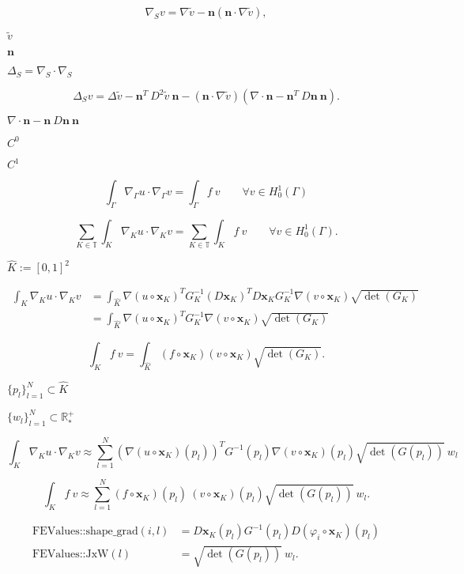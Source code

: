 \documentclass{article}
\begin{document}
\[ \nabla_S v = \nabla \tilde v - \mathbf n (\mathbf n \cdot \nabla \tilde v), \]
\pagebreak

$\tilde v$
\pagebreak

$\mathbf n$
\pagebreak

$\Delta_S = \nabla_S \cdot \nabla_S$
\pagebreak

\[ \Delta_S v = \Delta \tilde v - \mathbf n^T \ D^2 \tilde v \ \mathbf n - (\mathbf n \cdot \nabla \tilde v) (\nabla \cdot \mathbf n - \mathbf n^T \ D \mathbf n \ \mathbf n ). \]
\pagebreak

$\nabla \cdot \mathbf n - \mathbf n \ D \mathbf n \ \mathbf n$
\pagebreak

$C^0$
\pagebreak

$C^1$
\pagebreak

\[ \int_\Gamma \nabla_\Gamma u \cdot \nabla_\Gamma v = \int_\Gamma f \ v \qquad \forall v \in H^1_0(\Gamma) \]
\pagebreak

\[ \sum_{K\in {\mathbb T}}\int_K \nabla_{K} u \cdot \nabla_{K} v = \sum_{K\in {\mathbb T}} \int_K f \ v \qquad \forall v \in H^1_0(\Gamma). \]
\pagebreak

$\hat K:= [0,1]^2$
\pagebreak

\begin{align*} \int_{K} \nabla_{K} u \cdot \nabla_{K} v &= \int_{\hat K} \nabla (u \circ \mathbf x_K)^T G_K^{-1} (D \mathbf x_K)^T D \mathbf x_K G_K^{-1} \nabla (v \circ \mathbf x_K) \sqrt{\det (G_K)} \\ &= \int_{\hat K} \nabla (u \circ \mathbf x_K)^T G_K^{-1} \nabla (v \circ \mathbf x_K) \sqrt{\det (G_K)} \end{align*}
\pagebreak

\[ \int_{K} f \ v = \int_{\hat K} (f \circ \mathbf x_K) (v \circ \mathbf x_K) \sqrt{\det (G_K)}. \]
\pagebreak

$\{p_l\}_{l=1}^N\subset \hat K$
\pagebreak

$\{w_l\}_{l=1}^N \subset \mathbb R^+_*$
\pagebreak

\[\int_{K} \nabla_{K} u \cdot \nabla_{K} v \approx \sum_{l=1}^N (\nabla (u \circ \mathbf x_K)(p_l))^T G^{-1}(p_l) \nabla (v \circ \mathbf x_K) (p_l) \sqrt{\det (G(p_l))} \ w_l \]
\pagebreak

\[ \int_{K} f \ v \approx \sum_{l=1}^N (f \circ \mathbf x_K)(p_l) \ (v \circ \mathbf x_K)(p_l) \sqrt{\det (G(p_l))} \ w_l. \]
\pagebreak

\begin{align*} \text{FEValues::shape\_grad}(i,l)&=D \mathbf x_K(p_l) G^{-1}(p_l)D(\varphi_i \circ \mathbf x_K) (p_l) \\ \text{FEValues::JxW}(l) &= \sqrt{\det (G(p_l))} \ w_l. \end{align*}
\pagebreak
\end{document}
